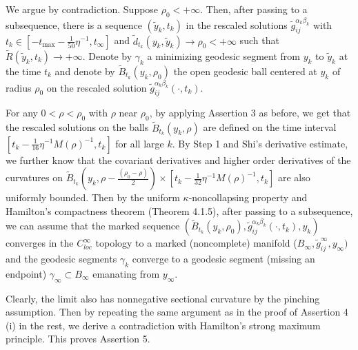 We argue by contradiction. Suppose $\rho_0<+\infty$. Then, after
passing to a subsequence, there is a sequence $(\tilde{y}_k,t_k)$
in the rescaled solutions $\widetilde{g}^{\alpha_k\beta_k}_{ij}$
with $t_k \in [-t_{\max}-\frac{1}{50}\eta^{-1},t_{\infty}]$ and
$\tilde{d}_{t_k}(y_k,\tilde{y}_k)\rightarrow\rho_0<+\infty$ such
that $\widetilde{R}(\tilde{y}_k,t_k)\rightarrow +\infty$. Denote
by $\gamma_k$ a minimizing geodesic segment from $y_k$ to
$\tilde{y}_k$ at the time $t_k$ and denote by
$\widetilde{B}_{t_k}(y_k,\rho_0)$ the open geodesic ball centered
at $y_k$ of radius $\rho_0$ on the rescaled solution
$\widetilde{g}^{\alpha_k\beta_k}_{ij}(\cdot,t_k)$.

For any $0<\rho<\rho_0$ with $\rho$ near $\rho_0$, by applying
Assertion 3 as before, we get that  the rescaled solutions on the
balls $\widetilde{B}_{t_k}(y_k,\rho)$ are defined on the time
interval $[t_k-\frac{1}{16}\eta^{-1}M(\rho)^{-1},t_k]$ for all
large $k$. By Step 1 and Shi's derivative estimate, we further
know that the covariant derivatives and higher order derivatives
of the curvatures on
$\widetilde{B}_{t_k}(y_k,\rho-\frac{(\rho_0-\rho)}{2})
\times[t_k-\frac{1}{32}\eta^{-1}M(\rho)^{-1},t_k]$ are also
uniformly bounded. Then by the uniform $\kappa$-noncollapsing
property and Hamilton's compactness theorem (Theorem 4.1.5), after
passing to a subsequence, we can assume that the marked sequence
$(\tilde{B}_{t_k}(y_k,\rho_0),\widetilde{g}^{\alpha_k\beta_k}_{ij}
(\cdot,t_k),y_k)$ converges in the $C^{\infty}_{loc}$ topology to
a marked (noncomplete) manifold
($B_{\infty},\widetilde{g}^{\infty}_{ij},y_{\infty})$ and the
geodesic segments $\gamma_k$ converge to a geodesic segment
(missing an endpoint) $\gamma_{\infty}\subset B_{\infty}$
emanating from $y_{\infty}$.

Clearly, the limit also has nonnegative sectional curvature by the
pinching assumption. Then by repeating the same argument as in the
proof of Assertion 4 (i) in the rest, we derive a contradiction
with Hamilton's strong maximum principle. This proves Assertion 5.

